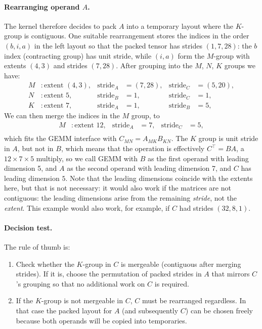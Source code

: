 \documentclass[11pt]{article}
\begin{document}
\paragraph{Rearranging operand $A$.}  The kernel therefore decides to pack $A$ into a temporary
layout where the $K$-group is contiguous.  One suitable rearrangement stores the indices in the order
$(b, i, a)$ in the left layout so that the packed tensor has strides $(1, 7, 28)$: the $b$ index (contracting group)
has unit stride, while $(i, a)$ form the $M$-group with extents $(4, 3)$ and strides $(7, 28)$.
After grouping into the $M$, $N$, $K$ groups we have:
\begin{align*}
  M &: \text{extent } (4,3), &\text{stride}_A &= (7,28), &\text{stride}_C &= (5,20), \\
  N &: \text{extent } 5,  &\text{stride}_B &= 1, &\text{stride}_C &= 1, \\
  K &: \text{extent } 7,  &\text{stride}_A &= 1, &\text{stride}_B &= 5,
\end{align*}
We can then merge the indices in the $M$ group, to
\begin{align*}
  M &: \text{extent } 12, &\text{stride}_A &= 7, &\text{stride}_C &= 5, \\
\end{align*}
which fits the GEMM interface with $C_{MN} = A_{MK} B_{KN}$. The $K$ group is unit stride in $A$, but not in $B$,
which means that the operation is effectively $C^\top = B A$, a $12\times 7 \times 5$ multiply,
so we call GEMM with $B$ as the first operand with leading dimension 5, and $A$ as the second operand with leading dimension 7,
and $C$ has leading dimension $5$. Note that the leading dimensions coincide with the extents here, but that is not necessary:
it would also work if the matrices are not contiguous: the leading dimensions arise from the remaining \emph{stride}, not
the \emph{extent}. This example would also work, for example, if $C$ had strides $(32,8,1)$.

\paragraph{Decision test.}  The rule of thumb is:
\begin{enumerate}
  \item Check whether the $K$-group in $C$ is mergeable (contiguous after merging strides).  If it
        is, choose the permutation of packed strides in $A$ that mirrors $C$'s grouping so that no
        additional work on $C$ is required.
  \item If the $K$-group is not mergeable in $C$, $C$ must be rearranged regardless.  In that case the
        packed layout for $A$ (and subsequently $C$) can be chosen freely because both operands will
        be copied into temporaries.
\end{enumerate}
\end{document}

